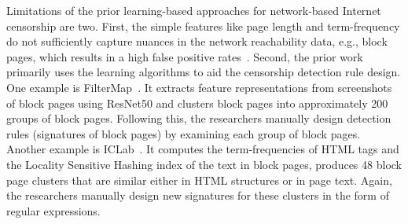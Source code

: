 Limitations of the prior learning-based approaches for network-based Internet
censorship are two. First, the simple features like page length and
term-frequency do not sufficiently capture nuances in the network reachability
data, e.g., block pages, which results in a high false positive
rates~\cite{yadav2018light}. Second, the prior work primarily uses the learning
algorithms to aid the censorship detection rule design. One example is
FilterMap~\cite{raman_measuring_2020}.  It extracts feature representations from
screenshots of block pages using ResNet50 and clusters block pages into
approximately 200 groups of block pages.  Following this, the researchers
manually design detection rules (signatures of block pages) by examining each
group of block pages. Another example is ICLab~\cite{niaki2020iclab}.  It
computes the term-frequencies of HTML tags and the Locality Sensitive Hashing
index of the text in block pages, produces 48 block page clusters that are
similar either in HTML structures or in page text.  Again, the researchers
manually design new signatures for these clusters in the form of regular expressions. 

